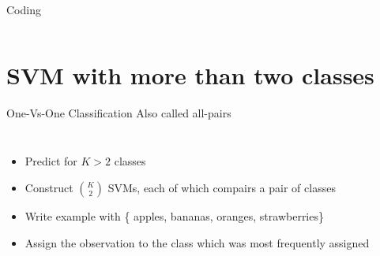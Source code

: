 \documentclass[aspectratio=169,usenames,dvipsnames]{beamer}
\newcommand{\InstructorList}[1]{
\begin{itemize}
	\color{orange}
	#1
\end{itemize}
}
\begin{document}


{
\begin{frame}[t]{Coding}
\begin{columns}
\centering
{}
\centering
\end{columns}
\end{frame}
}




\section{SVM with more than two classes}

\begin{frame}[t]{One-Vs-One Classification}
	{Also called all-pairs}

\begin{columns}
\centering
\InstructorList{
  \item
Predict for $K>2$ classes
\item Construct $\binom{K}{2}$ SVMs, each of which compairs a pair of classes
\item Write example with \{ apples, bananas, oranges, strawberries\}
\item Assign the observation to the class which was most frequently assigned
}



\centering

\end{columns}

\end{frame}
\end{document}
